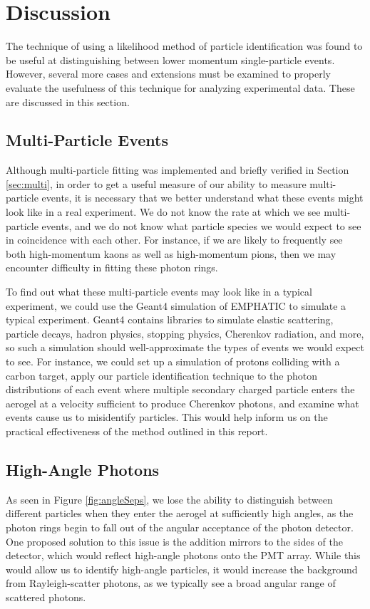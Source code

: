 
\chapter{Discussion}
\label{ch:Discussion}

The technique of using a likelihood method of  particle identification was found to be useful at distinguishing between lower momentum single-particle events.
However, several more cases and extensions must be examined to properly evaluate the usefulness of this technique for analyzing experimental data. 
These are discussed in this section. 

\section{Multi-Particle Events}
Although multi-particle fitting was implemented and briefly verified in Section \ref{sec:multi}, in order to get a useful measure of our ability to measure multi-particle events, it is necessary that we better understand what these events might look like in a real experiment.
We do not know the rate at which we see multi-particle events, and we do not know what particle species we would expect to see in coincidence with each other.
For instance, if we are likely to frequently see both high-momentum kaons as well as high-momentum pions, then we may encounter difficulty in fitting these photon rings.

To find out what these multi-particle events may look like in a typical experiment, we could use the Geant4 simulation of EMPHATIC to simulate a typical experiment.
Geant4 contains libraries to simulate elastic scattering, particle decays, hadron physics, stopping physics, Cherenkov radiation, and more, so such a simulation should well-approximate the types of events we would expect to see.
For instance, we could set up a simulation of protons colliding with a carbon target, apply our particle identification technique to the photon distributions of each event where multiple secondary charged particle enters the aerogel at a velocity sufficient to produce Cherenkov photons, and examine what events cause us to misidentify particles.
This would help inform us on the practical effectiveness of the method outlined in this report.

\section{High-Angle Photons}
As seen in Figure \ref{fig:angleSeps}, we lose the ability to distinguish between different particles when they enter the aerogel at sufficiently high angles, as the photon rings begin to fall out of the angular acceptance of the photon detector.
One proposed solution to this issue is the addition mirrors to the sides of the detector, which would reflect high-angle photons onto the PMT array. 
While this would allow us to identify high-angle particles, it would increase the background from Rayleigh-scatter photons, as we typically see a broad angular range of scattered photons.

